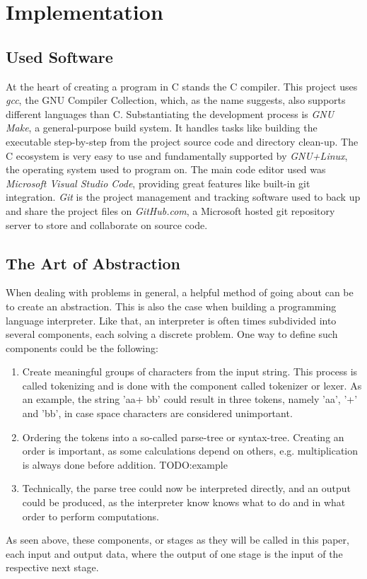 \documentclass[12pt,a4paper,man]{apa7}
\begin{document}
\section{Implementation}
\subsection{Used Software}
At the heart of creating a program in C stands the C compiler. This project uses
\emph{gcc}, the GNU Compiler Collection, which, as the name suggests, also 
supports different languages than C. Substantiating the development process is 
\emph{GNU Make}, a general-purpose build system. It handles tasks like building
the executable step-by-step from the project source code and directory clean-up.
The C ecosystem is very easy to use and fundamentally supported by 
\emph{GNU+Linux}, the operating system used to program on.
The main code editor used was \emph{Microsoft Visual Studio Code}, providing great
features like built-in git integration.
\emph{Git} is the project management and tracking software used to back up and share
the project files on \emph{GitHub.com}, a Microsoft hosted git repository server to
store and collaborate on source code.

\subsection{The Art of Abstraction}
When dealing with problems in general, a helpful method of going about can be
to create an abstraction. This is also the case when building a programming
language interpreter. Like that, an interpreter is often times subdivided into several
components, each solving a discrete problem. One way to define
such components could be the following:
\begin{enumerate}\label{simple interpreter}
    \item Create meaningful groups of characters from the input string. This
        process is called tokenizing and is done with the component called
        tokenizer or lexer. As an example, the string 'aa+  bb' could result
        in three tokens, namely 'aa', '+' and 'bb', in case space characters
        are considered unimportant.
    \item Ordering the tokens into a so-called parse-tree or syntax-tree.
        Creating an order is important, as some calculations depend on others, e.g. multiplication
        is always done before addition. TODO:example
    \item Technically, the parse tree could now be interpreted directly, and
        an output could be produced, as the interpreter know knows what to do
        and in what order to perform computations.
\end{enumerate}
As seen above, these components, or stages as they will be called in this paper,
each input and output data, where the output of one stage is the input of the
respective next stage.
\end{document}
